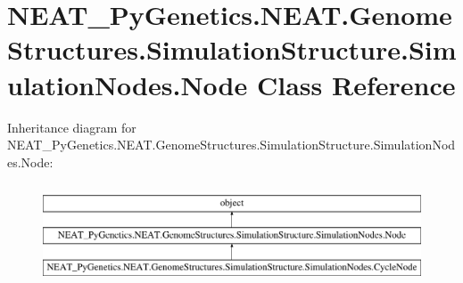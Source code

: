 \hypertarget{class_n_e_a_t___py_genetics_1_1_n_e_a_t_1_1_genome_structures_1_1_simulation_structure_1_1_simulation_nodes_1_1_node}{}\section{N\+E\+A\+T\+\_\+\+Py\+Genetics.\+N\+E\+A\+T.\+Genome\+Structures.\+Simulation\+Structure.\+Simulation\+Nodes.\+Node Class Reference}
\label{class_n_e_a_t___py_genetics_1_1_n_e_a_t_1_1_genome_structures_1_1_simulation_structure_1_1_simulation_nodes_1_1_node}
Inheritance diagram for N\+E\+A\+T\+\_\+\+Py\+Genetics.\+N\+E\+A\+T.\+Genome\+Structures.\+Simulation\+Structure.\+Simulation\+Nodes.\+Node\+:\begin{figure}[H]
\begin{center}
\leavevmode
\includegraphics[height=3.000000cm]{class_n_e_a_t___py_genetics_1_1_n_e_a_t_1_1_genome_structures_1_1_simulation_structure_1_1_simulation_nodes_1_1_node}
\end{center}
\end{figure}
